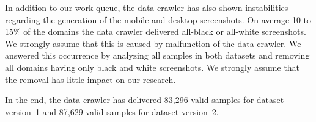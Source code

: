 In addition to our work queue, the data crawler has also shown instabilities regarding the generation of the mobile and desktop screenshots. On average 10 to 15\% of the domains the data crawler delivered all-black or all-white screenshots. We strongly assume that this is caused by malfunction of the data crawler. We answered this occurrence by analyzing all samples in both datasets and removing all domains having only black and white screenshots. We strongly assume that the removal has little impact on our research.

In the end, the data crawler has delivered 83,296 valid samples for dataset version~1 and 87,629 valid samples for dataset version~2.
